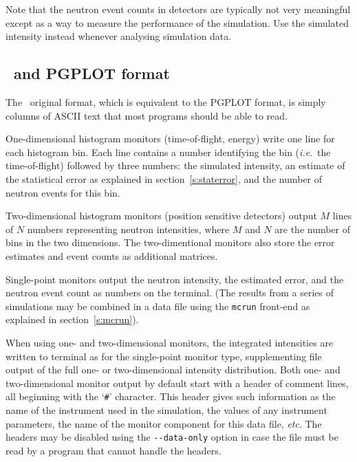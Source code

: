 Note that the neutron event counts in detectors are typically not very
meaningful except as a way to measure the performance of the
simulation. Use the simulated intensity instead whenever analysing
simulation data.

\subsection{\MCS\ and PGPLOT format}
 
The \MCS\ original format, which is equivalent to the PGPLOT format, is simply columns of ASCII text that most programs should
be able to read.

One-dimensional histogram monitors (time-of-flight, energy)
write one line for each histogram bin. Each line contains a number
identifying the bin (\textit{i.e}.\ the time-of-flight) followed by
three numbers: the simulated intensity, an estimate of the statistical
error as explained in section~\ref{s:staterror}, and the number of
neutron events for this bin.

Two-dimensional histogram monitors (position sensitive detectors)
output $M$ lines of $N$ numbers representing neutron intensities, where
$M$ and $N$ are the number of bins in the two dimensions. The
two-dimentional monitors also store the error estimates and event counts as additional matrices.

Single-point monitors output the neutron intensity, the estimated
error, and the neutron event count as numbers on the
terminal. (The results from a series of simulations may be combined in a
data file using the \verb+mcrun+ front-end as explained in
section~\ref{s:mcrun}).

When using one- and two-dimensional monitors, the integrated
intensities are written to terminal as for the single-point monitor
type, supplementing file output of the full one- or two-dimensional
intensity distribution. Both one- and two-dimensional monitor output by default start with a
header of comment lines, all beginning with the `\verb+#+' character.
This header gives such information as the name of the instrument used in
the simulation, the values of any instrument parameters, the name of the
monitor component for this data file, \textit{etc}. The headers may be
disabled using the \verb+--data-only+ option in case the file must be
read by a program that cannot handle the headers.

